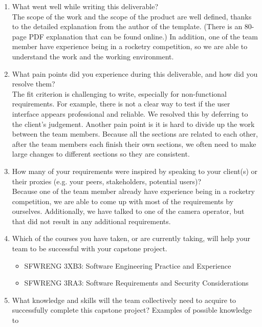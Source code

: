 \documentclass[12pt]{article}
\begin{document}
\begin{enumerate}
  \item What went well while writing this deliverable?\\[2mm] The scope of the work and the
        scope of the product are well defined, thanks to the detailed explanation from
        the author of the template. (There is an 80-page PDF explanation that can be found
        online.) In addition, one of the team member have experience being in a
        rocketry competition, so we are able to understand the work and the working
        environment.
  \item What pain points did you experience during this deliverable, and how did you
        resolve them? \\[2mm] The fit criterion is challenging to write, especially for
        non-functional requirements. For example, there is not a clear way to test if
        the user interface appears professional and reliable. We resolved this by
        deferring to the client's judgement. Another pain point is it is hard to divide
        up the work between the team members. Because all the sections are related to
        each other, after the team members each finish their own sections, we often
        need to make large changes to different sections so they are consistent.
  \item How many of your requirements were inspired by speaking to your client(s) or
        their proxies (e.g. your peers, stakeholders, potential users)? \\[2mm] Because one
        of the team member already have experience being in a rocketry competition, we
        are able to come up with most of the requirements by ourselves. Additionally,
        we have talked to one of the camera operator, but that did not result in any
        additional requirements.
  \item Which of the courses you have taken, or are currently taking, will help your
        team to be successful with your capstone project.
        \begin{itemize}
          \item SFWRENG 3XB3: Software Engineering Practice and Experience
          \item SFWRENG 3RA3: Software Requirements and Security Considerations
        \end{itemize}
  \item What knowledge and skills will the team collectively need to acquire to
        successfully complete this capstone project? Examples of possible knowledge to

\end{enumerate}
\end{document}
